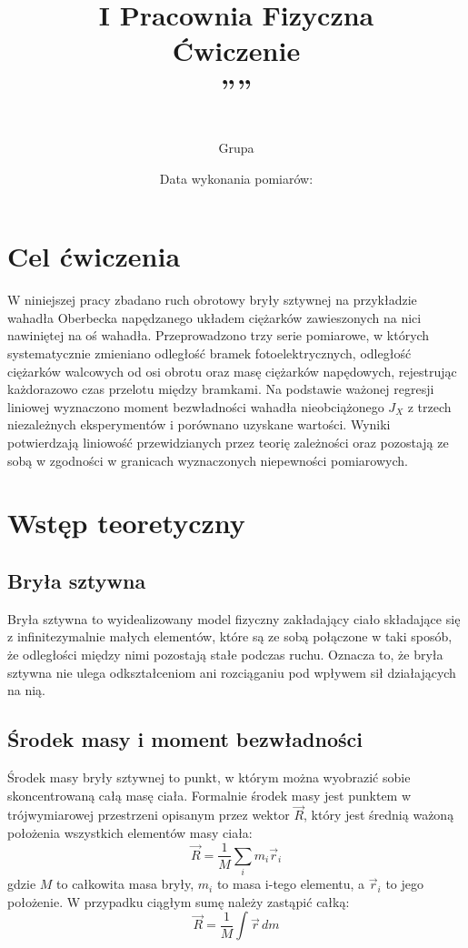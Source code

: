 \documentclass[12pt, a4paper]{article}
\title{
    \large I Pracownia Fizyczna \\[0.5em]
    \textbf{Ćwiczenie \nrCwiczenia} \\[0.3em]
    \LARGE \tytul\space''\codeword''
}
\author{
    \autor\\
     Grupa \nrGrupy}
\date{
    Data wykonania pomiarów: \dataWykonania\\
}
\begin{document}

\maketitle
\thispagestyle{empty}
\newpage

\section{Cel ćwiczenia}
W niniejszej pracy zbadano ruch obrotowy bryły sztywnej na przykładzie wahadła Oberbecka napędzanego układem ciężarków zawieszonych na nici nawiniętej na oś wahadła. Przeprowadzono trzy serie pomiarowe, w których systematycznie zmieniano odległość bramek fotoelektrycznych, odległość ciężarków walcowych od osi obrotu oraz masę ciężarków napędowych, rejestrując każdorazowo czas przelotu między bramkami. Na podstawie ważonej regresji liniowej wyznaczono moment bezwładności wahadła nieobciążonego $J_X$ z trzech niezależnych eksperymentów i porównano uzyskane wartości. Wyniki potwierdzają liniowość przewidzianych przez teorię zależności oraz pozostają ze sobą w zgodności w granicach wyznaczonych niepewności pomiarowych.

\section{Wstęp teoretyczny}

\subsection{Bryła sztywna}
Bryła sztywna to wyidealizowany model fizyczny zakładający ciało składające się z infinitezymalnie małych elementów, które są ze sobą połączone w taki sposób, że odległości między nimi pozostają stałe podczas ruchu. Oznacza to, że bryła sztywna nie ulega odkształceniom ani rozciąganiu pod wpływem sił działających na nią.

\subsection{Środek masy i moment bezwładności}
Środek masy bryły sztywnej to punkt, w którym można wyobrazić sobie skoncentrowaną całą masę ciała. Formalnie środek masy jest punktem w trójwymiarowej przestrzeni opisanym przez wektor \(\vec{R}\), który jest średnią ważoną położenia wszystkich elementów masy ciała:
\begin{equation}
    \vec{R} = \frac{1}{M} \sum_{i} m_i \vec{r}_i
\end{equation}
gdzie \(M\) to całkowita masa bryły, \(m_i\) to masa i-tego elementu, a \(\vec{r}_i\) to jego położenie.
W przypadku ciągłym sumę należy zastąpić całką:
\begin{equation}
    \vec{R} = \frac{1}{M} \int \vec{r} \, dm
\end{equation}
\end{document}

